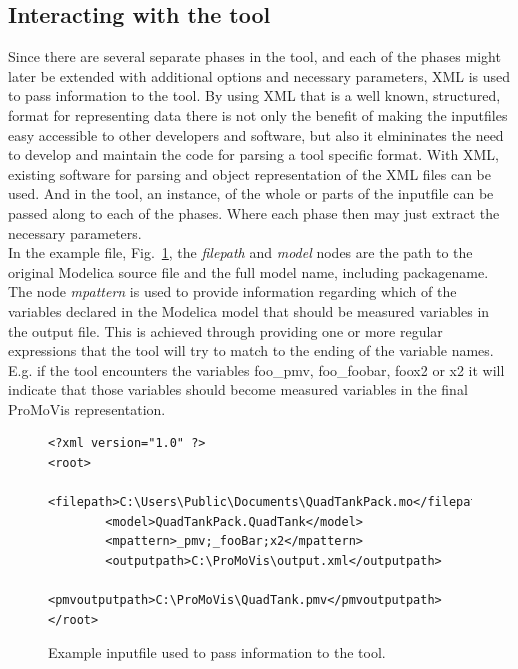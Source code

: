 \subsection{Interacting with the tool}
Since there are several separate phases in the tool, and each of the phases might later be extended with additional options and necessary parameters, XML is used to pass information to the tool. By using XML that is a well known, structured, format for representing data there is not only the benefit of making the inputfiles easy accessible to other developers and software, but also it elmininates the need to develop and maintain the code for parsing a tool specific format. With XML, existing software for parsing and object representation of the XML files can be used. And in the tool, an instance, of the whole or parts of the inputfile can be passed along to each of the phases. Where each phase then may just extract the necessary parameters. \\\newline %
In the example file,  Fig.~\ref{fig:coding},  %
the \textit{filepath} and \textit{model} nodes are the path to the original Modelica source file and the full model name, including packagename. The node \textit{mpattern} is used to provide information regarding which of the variables declared in the Modelica model that should be measured variables in the output file. This is achieved through providing one or more regular expressions that the tool will try to match to the ending of the variable names. E.g. if the tool encounters the variables foo\_pmv, foo\_foobar, foox2 or x2 it will indicate that those variables should become measured variables in the final ProMoVis representation.
%
\begin{figure}
\lstset{language=XML}
\begin{lstlisting}
<?xml version="1.0" ?> 
<root>
        <filepath>C:\Users\Public\Documents\QuadTankPack.mo</filepath>
        <model>QuadTankPack.QuadTank</model>
        <mpattern>_pmv;_fooBar;x2</mpattern>
        <outputpath>C:\ProMoVis\output.xml</outputpath>
        <pmvoutputpath>C:\ProMoVis\QuadTank.pmv</pmvoutputpath>
</root>
\end{lstlisting}
\caption{Example inputfile used to pass information to the tool.}
\label{fig:coding}
\end{figure} 
%

